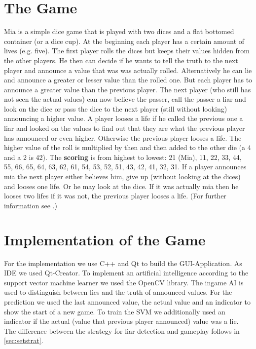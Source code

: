 \documentclass[11pt]{article}
\begin{document}
\section{The Game}
Mia is a simple dice game that is played with two dices and a flat bottomed container (or a dice cup). At the beginning each player has a certain amount of lives (e.g. five).
The first player rolls the dices but keeps their values hidden from the other players. He then can decide if he wants to tell the truth to the next player and announce a value that was was actually rolled. Alternatively he can lie and announce a greater or lesser value than the rolled one.
But each player has to announce a greater value than the previous player.
The next player (who still has not seen the actual values) can now believe the passer, call the passer a liar and look on the dice or pass the dice to the next player (still without looking) announcing a higher value. 
A player looses a life if he called the previous one a liar and looked on the values to find out that they are what the previous player has announced or even higher. Otherwise the previous player looses a life. 
The higher value of the roll is multiplied by then and then added to the other die (a 4 and a 2 is 42). 
The \textbf{scoring} is from highest to lowest:  21 (Mia), 11, 22, 33, 44, 55, 66, 65, 64, 63, 62, 61, 54, 53, 52, 51, 43, 42, 41, 32, 31.
If a player announces mia the next player either believes him, give up (without looking at the dices) and looses one life. Or he may look at the dice. If it was actually mia then he looses two lifes if it was not, the previous player looses a life. (For further information see \cite{mia:2016}.)

\section{Implementation of the Game}
For the implementation we use C++ and Qt to build the GUI-Application. As IDE we used Qt-Creator. To implement an artificial intelligence according to the support vector machine learner we used the OpenCV library.
The ingame AI is used to distinguish between lies and the truth of announced values.
For the prediction we used the last announced value, the actual value and an indicator to show the start of a new game. 
To train the SVM we additionally used an indicator if the actual (value that previous player announced) value was a lie.\\
The difference between the strategy for liar detection and gameplay  follows in \cref{sec:setstrat}.
\end{document}
